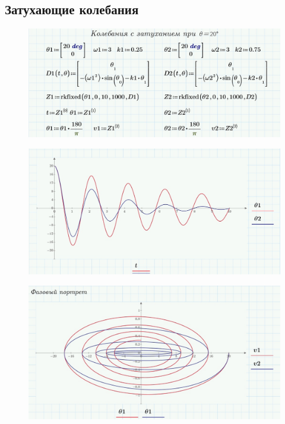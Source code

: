 \documentclass[a4paper, 14pt]{extarticle}
\begin{document}
	\subsection{Затухающие колебания}	
		\begin{figure}[H]
			\centering
			\includegraphics[width = \linewidth]{10.jpg}
		\end{figure}
		\begin{figure}[H]
			\centering
			\includegraphics[width = \linewidth]{11.jpg}
		\end{figure}
		\begin{figure}[H]
			\centering
			\includegraphics[width = \linewidth]{12.jpg}
		\end{figure}
\end{document}
